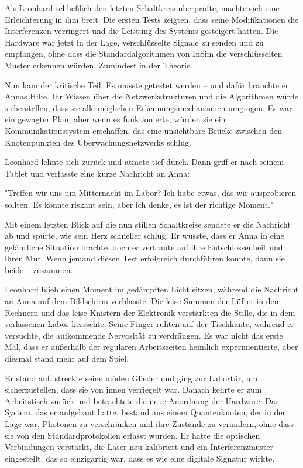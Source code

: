 \documentclass[
]{article}
\begin{document}
Als Leonhard schließlich den letzten Schaltkreis überprüfte, machte sich
eine Erleichterung in ihm breit. Die ersten Tests zeigten, dass seine
Modifikationen die Interferenzen verringert und die Leistung des Systems
gesteigert hatten. Die Hardware war jetzt in der Lage, verschlüsselte
Signale zu senden und zu empfangen, ohne dass die Standardalgorithmen
von InSim die verschlüsselten Muster erkennen würden. Zumindest in der
Theorie.

Nun kam der kritische Teil: Es musste getestet werden -- und dafür
brauchte er Annas Hilfe. Ihr Wissen über die Netzwerkstrukturen und die
Algorithmen würde sicherstellen, dass sie alle möglichen
Erkennungsmechanismen umgingen. Es war ein gewagter Plan, aber wenn es
funktionierte, würden sie ein Kommunikationssystem erschaffen, das eine
unsichtbare Brücke zwischen den Knotenpunkten des Überwachungsnetzwerks
schlug.

Leonhard lehnte sich zurück und atmete tief durch. Dann griff er nach
seinem Tablet und verfasste eine kurze Nachricht an Anna:

"Treffen wir uns um Mitternacht im Labor? Ich habe etwas, das wir
ausprobieren sollten. Es könnte riskant sein, aber ich denke, es ist der
richtige Moment."

Mit einem letzten Blick auf die nun stillen Schaltkreise sendete er die
Nachricht ab und spürte, wie sein Herz schneller schlug. Er wusste, dass
er Anna in eine gefährliche Situation brachte, doch er vertraute auf
ihre Entschlossenheit und ihren Mut. Wenn jemand diesen Test erfolgreich
durchführen konnte, dann sie beide -- zusammen.

Leonhard blieb einen Moment im gedämpften Licht sitzen, während die
Nachricht an Anna auf dem Bildschirm verblasste. Die leise Summen der
Lüfter in den Rechnern und das leise Knistern der Elektronik verstärkten
die Stille, die in dem verlassenen Labor herrschte. Seine Finger ruhten
auf der Tischkante, während er versuchte, die aufkommende Nervosität zu
verdrängen. Es war nicht das erste Mal, dass er außerhalb der regulären
Arbeitszeiten heimlich experimentierte, aber diesmal stand mehr auf dem
Spiel.

Er stand auf, streckte seine müden Glieder und ging zur Labortür, um
sicherzustellen, dass sie von innen verriegelt war. Danach kehrte er zum
Arbeitstisch zurück und betrachtete die neue Anordnung der Hardware. Das
System, das er aufgebaut hatte, bestand aus einem Quantenknoten, der in
der Lage war, Photonen zu verschränken und ihre Zustände zu verändern,
ohne dass sie von den Standardprotokollen erfasst wurden. Er hatte die
optischen Verbindungen verstärkt, die Laser neu kalibriert und ein
Interferenzmuster eingestellt, das so einzigartig war, dass es wie eine
digitale Signatur wirkte.
\end{document}
